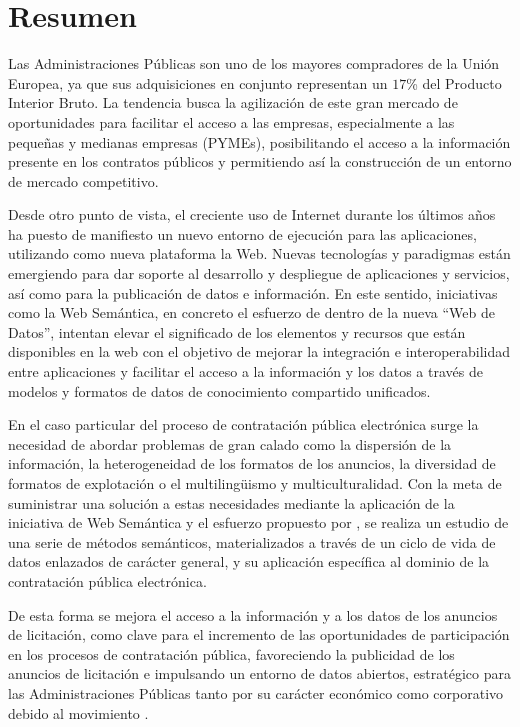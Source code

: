 %
%

\chapter*{Resumen}
Las Administraciones Públicas son uno de los mayores compradores de la Unión Europea, ya que
sus adquisiciones en conjunto representan un $17$\% del Producto Interior Bruto. La tendencia busca 
la agilización de este gran mercado de oportunidades para facilitar el acceso a las empresas, especialmente a 
las pequeñas y medianas empresas (PYMEs), posibilitando el acceso a la información presente 
en los contratos públicos y permitiendo así la construcción de un entorno de mercado competitivo. 

Desde otro punto de vista, el creciente uso de Internet durante los últimos años ha puesto de manifiesto un
nuevo entorno de ejecución para las aplicaciones, utilizando como nueva plataforma la Web. Nuevas tecnologías y paradigmas
están emergiendo para dar soporte al desarrollo y despliegue de aplicaciones y servicios, así como para la publicación de datos e información. 
En este sentido, iniciativas como la Web Semántica, en concreto el esfuerzo de \linkeddata dentro de la nueva ``Web de Datos'',
 intentan elevar el significado de los elementos y recursos que están disponibles en la web con el objetivo de mejorar 
la integración e interoperabilidad entre aplicaciones y facilitar el acceso a la información y los datos a 
través de modelos y formatos de datos de conocimiento compartido unificados.

En el caso particular del proceso de contratación pública electrónica surge la necesidad de abordar problemas de 
gran calado como la dispersión de la información, la heterogeneidad de los formatos de los anuncios, 
la diversidad de formatos de explotación o el multiling\"{u}ismo y multiculturalidad. Con la meta de suministrar 
una solución a estas necesidades mediante la aplicación de la iniciativa de Web Semántica y el esfuerzo 
propuesto por \linkeddata, se realiza un estudio de una serie de métodos semánticos, materializados a 
través de un ciclo de vida de datos enlazados de carácter general, y su aplicación 
específica al dominio de la contratación pública electrónica.

De esta forma se mejora el acceso a la información y a los datos de los anuncios de licitación, como clave para 
el incremento de las oportunidades de participación en los procesos de contratación pública, favoreciendo la 
publicidad de los anuncios de licitación e impulsando un entorno de datos abiertos, 
estratégico para las Administraciones Públicas tanto por su carácter económico 
como corporativo debido al movimiento \opendata. 

